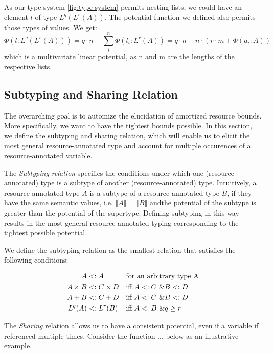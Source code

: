 As our type system \ref{fig:type-system} permits nesting lists, we could have an element $l$ of type $L^q(L^r(A))$. The potential function we defined also permits those types of values. We get: 
$$\Phi(l : L^q(L^r(A))) = q \cdot n + \displaystyle\sum_{i}^{n} \Phi(l_i : L^r(A)) = q \cdot n + n \cdot (r \cdot m + \Phi(a_i : A)) $$ 
which is a multivariate linear potential, as n and m are the lengths of the respective lists.

\subsection{Subtyping and Sharing Relation}
The overarching goal is to automize the elucidation of amortized resource bounds. More specifically, we want to have the tightest bounds possible. In this section, we define the subtyping and sharing relation, which will enable us to elicit the most general resource-annotated type and account for multiple occurences of a resource-annotated variable.

The \emph{Subtyping relation} specifies the conditions under which one (resource-annotated) type is a subtype of another (resource-annotated) type. Intuitively, a resource-annotated type $A$ is a subtype of a resource-annotated type $B$, if they have the same semantic values, i.e. $\llbracket A \rrbracket = \llbracket B \rrbracket$ andthe potential of the subtype is greater than the potential of the supertype. Defining subtyping in this way results in the most general resource-annotated typing corresponding to the tightest possible potential.

We define the subtyping relation as the smallest relation that satisfies the following conditions:

\begin{align*}
   A & <: A && \text{for an arbitrary type A} \\
   A \times B & <: C \times D && \text{iff.} A <: C ~ \& B <: D \\
   A + B & <: C + D && \text{iff.} A <: C ~ \& B <: D \\
   L^q(A) & <: L^r(B) && \text{iff.} A <: B ~ \& q \geq r \\
\end{align*}

The \emph{Sharing} relation allows us to have a consistent potential, even if a variable if referenced multiple times. Consider the function ... below as an illustrative example.

